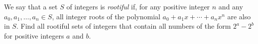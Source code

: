 We say that a set $S$ of integers is \emph{rootiful} if, for any positive integer $n$ and any $a_0,a_1,\ldots,a_n\in S$, all integer roots of the polynomial $a_0+a_1x+\cdots+a_nx^n$ are also in $S$. Find all rootiful sets of integers that contain all numbers of the form $2^a-2^b$ for positive integers $a$ and $b$.
